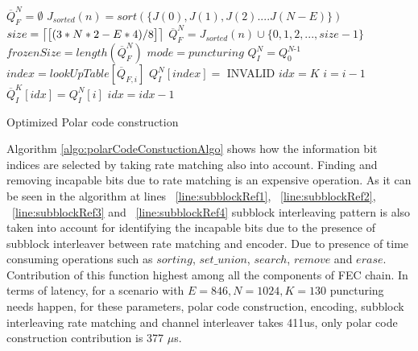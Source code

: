 \IncMargin{1.5em}
\begin{algorithm}[!h]
	$\overline{Q}_{\textit{F}}^{\textit{N}} = \emptyset$ \;
	 {
		 {   %
			$J_{sorted}(n) = sort(\{J(0),J(1),J(2)....J(N-E)\})$\;  \label{line:OptisubblockRef1}
			 {
				$size = \ceil*{\big[(3*N*2 - E*4)/8\big]}$\;
			} 
			$\overline{Q}_{F}^{N} = J_{sorted}(n) \cup \{0,1,2, ... ,size-1\}$ \; \label{line:OptisubblockRef2}
			$frozenSize = length(\overline{Q}_{F}^{N})$ \;
			$mode = puncturing$ \;
		} 
	}
	$Q_{\textit{I}}^{\textit{N}} = Q_{\textit{0}}^{\textit{N-1}}$ \;	
	 {
		 {
			$index = lookUpTable[\overline{Q}_{F,i}]$\;
		} 
		$Q_{I}^{N}[index] = $ INVALID \;
	}
	$idx = K$ \;
	 {
		$i = i-1$ \;
		 {
			$\overline{Q}_{\textit{I}}^{\textit{K}}[idx] = Q_{I}^{N}[i]$ \;
			$idx = idx-1$ \;
		}
	}
	\caption{Optimized Polar code construction}
	\label{algo:polarCodeConstuctionAlgoOptimized}
\end{algorithm}
\DecMargin{1.5em}

Algorithm \ref{algo:polarCodeConstuctionAlgo} shows how the information bit indices are selected by taking rate matching also into account. Finding and removing incapable bits due to rate matching is an expensive operation. As it can be seen in the algorithm at lines ~\ref{line:subblockRef1}, ~\ref{line:subblockRef2}, ~\ref{line:subblockRef3} and ~\ref{line:subblockRef4} subblock interleaving pattern is also taken into account for identifying the incapable bits due to the presence of subblock interleaver between rate matching and encoder. Due to presence of time consuming operations such as $ sorting $, $ set\_union $, $ search $, $ remove $ and $ erase $. Contribution of this function highest among all the components of FEC chain. In terms of latency, for a scenario with $E = 846, N = 1024, K = 130$ puncturing needs happen, for these parameters, polar code construction, encoding, subblock interleaving rate matching and channel interleaver takes 411us, only polar code construction contribution is 377 $\mu$s. \newline

